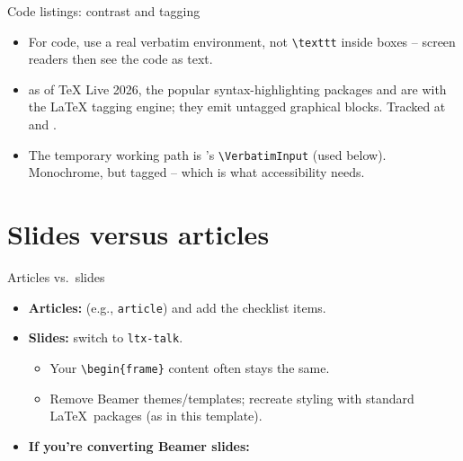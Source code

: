 \begin{frame*}{Code listings: contrast and tagging}
\begin{itemize}
\item For code, use a real verbatim environment, not \texttt{\textbackslash texttt} inside boxes -- screen readers then see the code as text.
\item {} as of TeX Live 2026, the popular syntax-highlighting packages  and  are  with the LaTeX tagging engine; they emit untagged graphical blocks. Tracked at  and .
\item The temporary working path is 's \texttt{\textbackslash VerbatimInput} (used below). Monochrome, but tagged -- which is what accessibility needs.
\end{itemize}

\medskip

\end{frame*}

\section{Slides versus articles}

\begin{frame}{Articles vs.\ slides}
\begin{itemize}
\item \textbf{Articles:}  (e.g., \texttt{article}) and add the checklist items.
\item \textbf{Slides:} switch to \texttt{ltx-talk}.
  \begin{itemize}
  \item Your \texttt{\textbackslash begin\{frame\}} content often stays the same.
  \item Remove Beamer themes/templates; recreate styling with standard \LaTeX\ packages (as in this template).
  \end{itemize}

\bigskip

\item \textbf{If you’re converting Beamer slides:}

\medskip  
{}
\end{itemize}
\end{frame}

